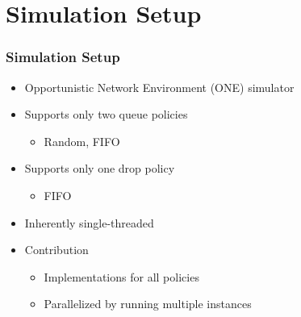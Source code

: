 \section{Simulation Setup}


\begin{frame}
  \frametitle{Simulation Setup}
  \begin{itemize}
    \item Opportunistic Network Environment (ONE) simulator
    \vspace{0.3cm}
    \item Supports only two queue policies
	\begin{itemize}
      \item Random, FIFO
    \end{itemize}
    \vspace{0.3cm}
    \item Supports only one drop policy
	\begin{itemize}
      \item FIFO
    \end{itemize}
	\vspace{0.2cm}
	\item Inherently single-threaded
	\vspace{0.3cm}
	\item Contribution
	\begin{itemize}
      \item Implementations for all policies
      \item Parallelized by running multiple instances
    \end{itemize}
  \end{itemize}
\end{frame}


